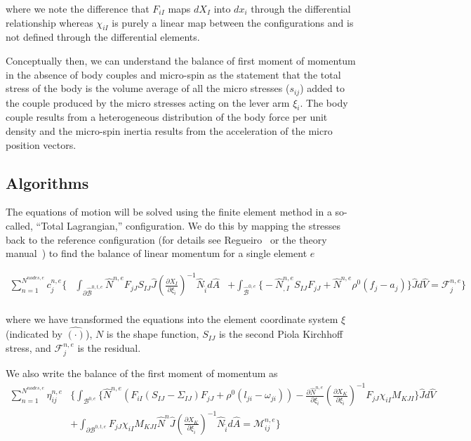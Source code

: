 where we note the difference that $F_{iI}$ maps $dX_I$ into $dx_i$ through the differential relationship whereas $\chi_{iI}$ is purely a linear map between the configurations and is not defined through the differential elements.

Conceptually then, we can understand the balance of first moment of momentum in the absence of body couples and micro-spin as the statement that the total stress of the body is the volume average of all the micro stresses ($s_{ij}$) added to the couple produced by the micro stresses acting on the lever arm $\xi_i$. The body couple results from a heterogeneous distribution of the body force per unit density and the micro-spin inertia results from the acceleration of the micro position vectors.

\subsection{Algorithms}

The equations of motion will be solved using the finite element method in a so-called, ``Total Lagrangian,'' configuration. We do this by mapping the stresses back to the reference configuration (for details see Regueiro~\cite{bib:regueiro_micro10} or the theory manual~\cite{bib:miller17}) to find the balance of linear momentum for a single element $e$

\begin{align*}
\sum_{n=1}^{N^{nodes,e}} c^{n,e}_j \bigg\{&\int_{\partial \hat{\mathcal{B}}^{0,t,e}} \hat{N}^{n,e} F_{jJ} S_{IJ} \hat{J} \left(\frac{\partial X_{I}}{\partial \xi_{\hat{i}}}\right)^{-1} \hat{N}_{\hat{i}} d\hat{A}& + \int_{\hat{\mathcal{B}}^{0,e}} \big\{- \hat{N}^{n,e}_{,I} S_{IJ} F_{jJ} + \hat{N}^{n,e} \rho^0 \left(f_j - a_j\right) \big\} \hat{J} d\hat{V} = \mathcal{F}_j^{n,e}\bigg\}\\
\end{align*}

where we have transformed the equations into the element coordinate system $\xi$ (indicated by $\hat{\left(\cdot\right)}$), $N$ is the shape function, $S_{IJ}$ is the second Piola Kirchhoff stress, and $\mathcal{F}_j^{n,e}$ is the residual.

We also write the balance of the first moment of momentum as
\begin{align*}
\sum_{n=1}^{N^{nodes,e}} \eta_{ij}^{n,e} &\bigg\{\int_{\mathcal{B}^{0,e}}  \bigg\{\hat{N}^{n,e} \left(F_{iI} \left(S_{IJ}-\Sigma_{IJ}\right) F_{jJ} + \rho^0\left(l_{ji} - \omega_{ji} \right)\right)  - \frac{\partial \hat{N}^{n,e}}{\partial \xi_{\hat{i}}} \left(\frac{\partial X_{K}}{\partial \xi_{\hat{i}}}\right)^{-1} F_{jJ} \chi_{iI}  M_{KJI} \bigg\} \hat{J} d\hat{V}\\
& + \int_{\partial \mathcal{B}^{0,t,e}} F_{jJ} \chi_{iI}  M_{KJI} \hat{N}^n \hat{J} \left(\frac{\partial X_{K}}{\partial \xi_{\hat{i}}}\right)^{-1} \hat{N}_{\hat{i}} d\hat{A} = \mathcal{M}_{ij}^{n,e} \bigg\}\\
\end{align*}

